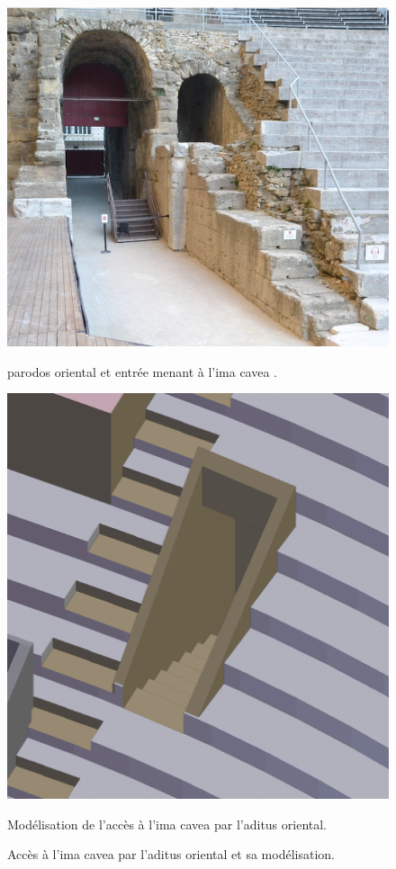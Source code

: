 \begin{figure}[!h]
	\centering
	\begin{subfigureth}{0.49\textwidth}
	\includegraphics[width=\textwidth]{images/parodos}
	\caption[\Gls{parodos} oriental et entrée menant à l'\gls{ima cavea}]{\Gls{parodos} oriental et entrée menant à l'\gls{ima cavea} \footnotemark.} 
	\label{parodos} 
		\end{subfigureth}	
	\begin{subfigureth}{0.41\textwidth}
	\includegraphics[width=\textwidth]{images/acces10emegradin}
	\caption{Modélisation de l'accès à l'\gls{ima cavea} par l'\gls{aditus} oriental.} 
	\label{acces10emegradin} 
	\end{subfigureth}
	\caption{Accès à l'\gls{ima cavea} par l'\gls{aditus} oriental et sa modélisation.} 
\end{figure}


